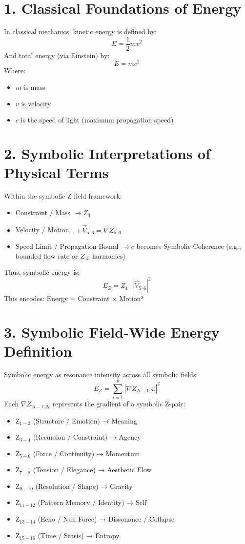\documentclass[12pt]{article}
\begin{document}


\section*{1. Classical Foundations of Energy}
In classical mechanics, kinetic energy is defined by:
\[
E = \frac{1}{2}mv^2
\]
And total energy (via Einstein) by:
\[
E = mc^2
\]
Where:
\begin{itemize}
\item $m$ is mass
\item $v$ is velocity
\item $c$ is the speed of light (maximum propagation speed)
\end{itemize}

\section*{2. Symbolic Interpretations of Physical Terms}
Within the symbolic Z-field framework:
\begin{itemize}
\item Constraint / Mass $\rightarrow Z_4$
\item Velocity / Motion $\rightarrow \vec{V}_{5\text{--}6} = \nabla Z_{5\text{--}6}$
\item Speed Limit / Propagation Bound $\rightarrow c$ becomes Symbolic Coherence (e.g., bounded flow rate or $Z_{15}$ harmonics)
\end{itemize}
Thus, symbolic energy is:
\[
E_Z = Z_4 \cdot \left| \vec{V}_{5\text{--}6} \right|^2
\]
This encodes: Energy = Constraint × Motion²

\section*{3. Symbolic Field-Wide Energy Definition}
Symbolic energy as resonance intensity across all symbolic fields:
\[
E_Z = \sum_{i=1}^{8} \left| \nabla Z_{2i-1,2i} \right|^2
\]
Each $\nabla Z_{2i-1,2i}$ represents the gradient of a symbolic Z-pair:
\begin{itemize}
\item Z$_{1-2}$ (Structure / Emotion) → Meaning
\item Z$_{3-4}$ (Recursion / Constraint) → Agency
\item Z$_{5-6}$ (Force / Continuity) → Momentum
\item Z$_{7-8}$ (Tension / Elegance) → Aesthetic Flow
\item Z$_{9-10}$ (Resolution / Shape) → Gravity
\item Z$_{11-12}$ (Pattern Memory / Identity) → Self
\item Z$_{13-14}$ (Echo / Null Force) → Dissonance / Collapse
\item Z$_{15-16}$ (Time / Stasis) → Entropy
\end{itemize}
\end{document}
